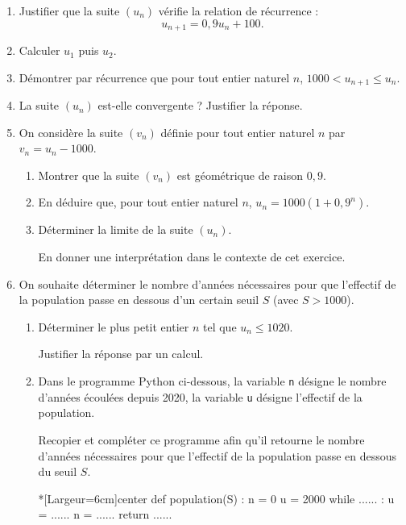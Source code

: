 \begin{enumerate}
	\item Justifier que la suite $\left(u_n\right)$ vérifie la relation de récurrence :\[u_{n+1} = 0,9u_n + 100.\]
	\item Calculer $u_1$ puis $u_2$.
	\item Démontrer par récurrence que pour tout entier naturel $n$, $\num{1000} < u_{n+1}  \leqslant u_n$.
	\item La suite $\left(u_n\right)$ est-elle convergente ? Justifier la réponse.
	\item On considère la suite $\left(v_n\right)$ définie pour tout entier naturel $n$ par $v_n = u_n - \num{1000}$.
	\begin{enumerate}
		\item Montrer que la suite $\left(v_n\right)$ est géométrique de raison $0,9$.
		\item En déduire que, pour tout entier naturel $n$, $u_n = \num{1000} \left(1 + 0,9^n\right)$.
		\item Déterminer la limite de la suite $\left(u_n\right)$.
		
		En donner une interprétation dans le contexte de cet exercice.
	\end{enumerate}
	\item On souhaite déterminer le nombre d'années nécessaires pour que l'effectif de la population passe en dessous d'un certain seuil $S$ (avec $S > \num{1000}$).
	\begin{enumerate}
		\item Déterminer le plus petit entier $n$ tel que $u_n \leqslant \num{1020}$.
		
		Justifier la réponse par un calcul.
		\item Dans le programme \textsf{Python} ci-dessous, la variable \texttt{n} désigne le nombre d'années écoulées depuis 2020, la variable \texttt{u} désigne l'effectif de la population. 
		
		Recopier et compléter ce programme afin qu'il retourne le nombre d'années nécessaires pour que l'effectif de la population passe en dessous du seuil $S$.
		
\begin{CodePythonLstAlt}*[Largeur=6cm]{center}
def population(S) :
	n = 0
	u = 2000
	while ...... :
		u = ......
		n = ......
	return ......
\end{CodePythonLstAlt}
	\end{enumerate}
\end{enumerate}

